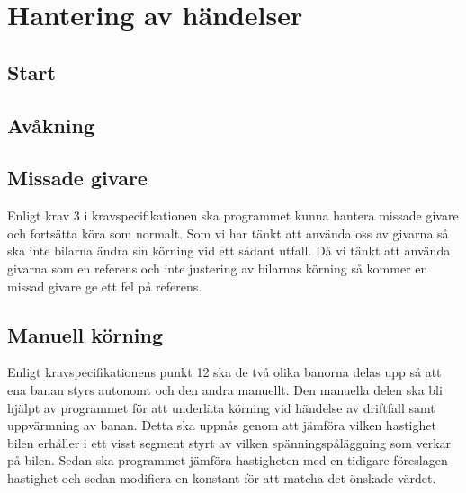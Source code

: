 \section{Hantering av händelser}


\subsection{Start}

\subsection{Avåkning}


\subsection{Missade givare}

Enligt krav 3 i kravspecifikationen ska programmet kunna hantera missade givare och fortsätta köra som normalt. Som vi har tänkt att använda oss av givarna så ska inte bilarna ändra sin körning vid ett sådant utfall. Då vi tänkt att använda givarna som en referens och inte justering av bilarnas körning så kommer en missad givare ge ett fel på referens.


\subsection{Manuell körning}
Enligt kravspecifikationens punkt 12 ska de två olika banorna delas upp så att ena banan styrs autonomt och den andra manuellt. 
Den manuella delen ska bli hjälpt av programmet för att underläta körning vid händelse av driftfall samt uppvärmning av banan.
Detta ska uppnås genom att jämföra vilken hastighet bilen erhåller i ett visst segment styrt av vilken spänningspåläggning som verkar på bilen.
Sedan ska programmet  jämföra hastigheten med en tidigare föreslagen hastighet och sedan modifiera en konstant för att matcha det önskade värdet.
